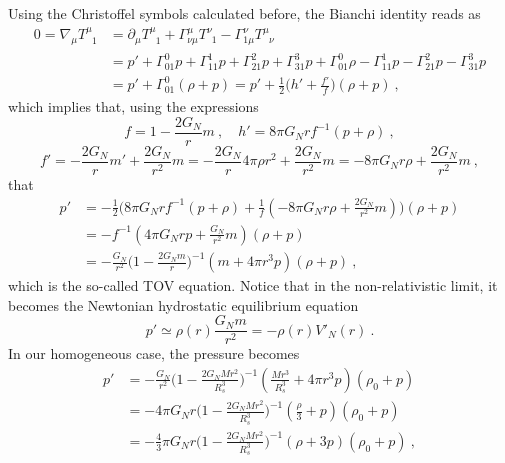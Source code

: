     Using the Christoffel symbols calculated before, the Bianchi identity reads as
    \begin{equation*}
    \begin{aligned}
        0 = \nabla_\mu T^\mu_{\phantom \mu 1} & = \partial_\mu T^{\mu}_{\phantom \mu 1} + \Gamma^{\mu}_{\nu\mu} T^{\nu}_{\phantom \nu 1} - \Gamma^{\nu}_{1\mu} T^{\mu}_{\phantom \mu \nu} \\ & = p' + \Gamma^0_{01} p + \Gamma^1_{11} p + \Gamma^2_{21} p + \Gamma^3_{31} p + \Gamma^0_{01} \rho - \Gamma^1_{11} p - \Gamma^2_{21} p - \Gamma^3_{31} p \\ & = p' + \Gamma^0_{01} (\rho + p) = p' + \frac{1}{2} \Big ( h' + \frac{f'}{f} \Big) (\rho + p) ~,
    \end{aligned}
    \end{equation*}
    which implies that, using the expressions 
    \begin{equation*}
        f = 1 - \frac{2 G_N}{r} m ~, \quad h' = 8 \pi G_N r f^{-1} (p + \rho) ~,
    \end{equation*}
    \begin{equation*}
        f' = - \frac{2 G_N}{r} m' + \frac{2 G_N}{r^2} m  = - \frac{2 G_N}{r} 4 \pi \rho r^2 + \frac{2 G_N}{r^2} m = - 8 \pi G_N r \rho + \frac{2 G_N}{r^2} m ~,
    \end{equation*}
    that
    \begin{equation*}
    \begin{aligned}
        p' & = - \frac{1}{2} \Big ( 8 \pi G_N r f^{-1} (p + \rho) + \frac{1}{f} (- 8 \pi G_N r \rho + \frac{2 G_N}{r^2} m ) \Big) (\rho + p) \\ & = - f^{-1} ( 4 \pi G_N r p + \frac{G_N}{r^2} m ) (\rho + p) \\ & = - \frac{G_N}{r^2} \Big (1 - \frac{2 G_N m}{r} \Big )^{-1} (m + 4 \pi r^3 p) (\rho + p) ~,
    \end{aligned}
    \end{equation*}
    which is the so-called TOV equation. 
    Notice that in the non-relativistic limit, it becomes the Newtonian hydrostatic equilibrium equation
    \begin{equation*}
        p' \simeq \rho(r) \frac{G_N m}{r^2} = - \rho(r) V'_N(r) ~.
    \end{equation*}
    In our homogeneous case, the pressure becomes 
    \begin{equation*}
    \begin{aligned}
        p' & = - \frac{G_N}{r^2} \Big (1 - \frac{2 G_N M r^2}{R_s^3}  \Big )^{-1} ( \frac{M r^3 }{R_s^3} + 4 \pi r^3 p) (\rho_0 + p) \\ & = - 4 \pi G_N r \Big (1 - \frac{2 G_N M r^2}{R_s^3}  \Big )^{-1} ( \frac{\rho}{3} + p) (\rho_0 + p) \\ & = - \frac{4}{3} \pi G_N r \Big (1 - \frac{2 G_N M r^2}{R_s^3}  \Big )^{-1} (\rho + 3 p) (\rho_0 + p) ~,
    \end{aligned}
    \end{equation*}
